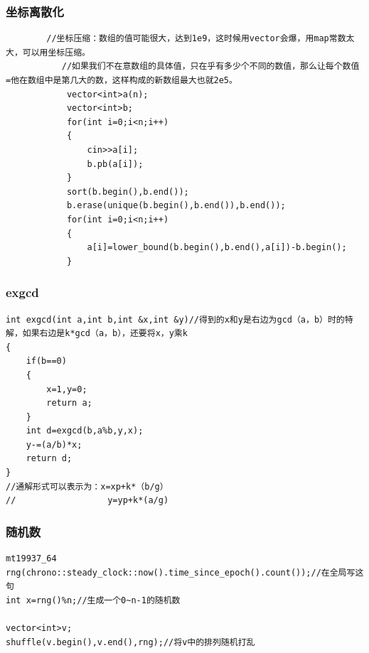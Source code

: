 \documentclass[10pt, a4paper, twocolumn]{article} %
\begin{document}
    \subsubsection{坐标离散化}
    \begin{lstlisting}
    	//坐标压缩：数组的值可能很大，达到1e9，这时候用vector会爆，用map常数太大，可以用坐标压缩。
           //如果我们不在意数组的具体值，只在乎有多少个不同的数值，那么让每个数值=他在数组中是第几大的数，这样构成的新数组最大也就2e5。
            vector<int>a(n);
			vector<int>b;
			for(int i=0;i<n;i++)
			{
				cin>>a[i];
				b.pb(a[i]);
			}
			sort(b.begin(),b.end());
			b.erase(unique(b.begin(),b.end()),b.end());
			for(int i=0;i<n;i++)
			{
				a[i]=lower_bound(b.begin(),b.end(),a[i])-b.begin();
			}
    \end{lstlisting}


    \subsubsection{exgcd}
    \begin{lstlisting}
int exgcd(int a,int b,int &x,int &y)//得到的x和y是右边为gcd（a，b）时的特解，如果右边是k*gcd（a，b），还要将x，y乘k
{
    if(b==0)
    {
        x=1,y=0;
        return a;
    }
    int d=exgcd(b,a%b,y,x);
    y-=(a/b)*x;
    return d;
}
//通解形式可以表示为：x=xp+k*（b/g）
//                  y=yp+k*(a/g)
    \end{lstlisting}
    \subsubsection{随机数}
    \begin{lstlisting}
mt19937_64 rng(chrono::steady_clock::now().time_since_epoch().count());//在全局写这句
int x=rng()%n;//生成一个0~n-1的随机数

vector<int>v;
shuffle(v.begin(),v.end(),rng);//将v中的排列随机打乱
    \end{lstlisting}
\end{document}
